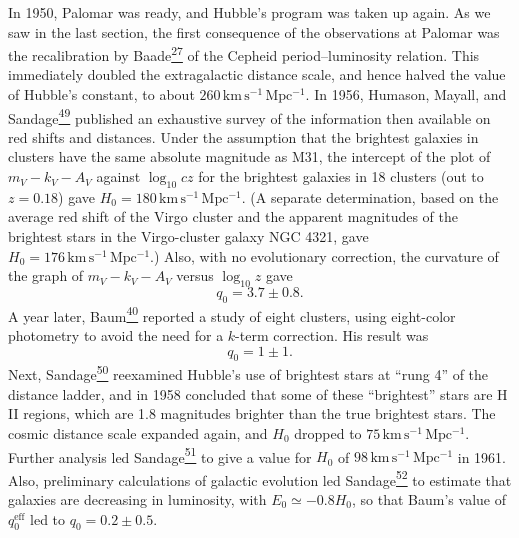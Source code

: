In 1950, Palomar was ready, and Hubble's program was taken up again. As we
saw in the last section, the first consequence of the observations at
Palomar was the recalibration by
Baade\hyperref[ch14-ref-27]{\textsuperscript{27}} of the Cepheid
period--luminosity relation. This immediately doubled the extragalactic
distance scale, and hence halved the value of Hubble's constant, to about
\(260\,\mathrm{km\,s^{-1}\,Mpc^{-1}}\). In 1956, Humason, Mayall, and
Sandage\hyperref[ch14-ref-49]{\textsuperscript{49}} published an exhaustive
survey of the information then available on red shifts and distances. Under
the assumption that the brightest galaxies in clusters have the same
absolute magnitude as M31, the intercept of the plot of
\(m_V-k_V-A_V\) against \(\log_{10}cz\) for the brightest galaxies in 18
clusters (out to \(z=0.18\)) gave
\(H_0=180\,\mathrm{km\,s^{-1}\,Mpc^{-1}}\). (A separate determination,
based on the average red shift of the Virgo cluster and the apparent
magnitudes of the brightest stars in the Virgo-cluster galaxy NGC 4321, gave
\(H_0=176\,\mathrm{km\,s^{-1}\,Mpc^{-1}}\).) Also, with no evolutionary
correction, the curvature of the graph of \(m_V-k_V-A_V\) versus
\(\log_{10}z\) gave
\[
  q_0=3.7\pm0.8.
\]
A year later, Baum\hyperref[ch14-ref-40]{\textsuperscript{40}} reported a
study of eight clusters, using eight-color photometry to avoid the need for
a \(k\)-term correction. His result was
\[
  q_0=1\pm1.
\]
Next, Sandage\hyperref[ch14-ref-50]{\textsuperscript{50}} reexamined
Hubble's use of brightest stars at ``rung 4'' of the distance ladder, and in
1958 concluded that some of these ``brightest'' stars are H\,II regions,
which are 1.8 magnitudes brighter than the true brightest stars. The cosmic
distance scale expanded again, and \(H_0\) dropped to
\(75\,\mathrm{km\,s^{-1}\,Mpc^{-1}}\). Further analysis led
Sandage\hyperref[ch14-ref-51]{\textsuperscript{51}} to give a value for
\(H_0\) of \(98\,\mathrm{km\,s^{-1}\,Mpc^{-1}}\) in 1961. Also,
preliminary calculations of galactic evolution led
Sandage\hyperref[ch14-ref-52]{\textsuperscript{52}} to estimate that
galaxies are decreasing in luminosity, with \(E_0\simeq-0.8H_0\), so that
Baum's value of \(q_0^{\mathrm{eff}}\) led to \(q_0=0.2\pm0.5\).




